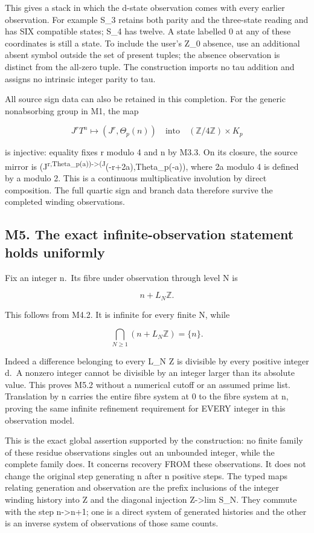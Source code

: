 This gives a stack in which the d-state observation comes with every
earlier observation. For example S\_3 retains both parity and the
three-state reading and has SIX compatible states; S\_4 has twelve. A
state labelled 0 at any of these coordinates is still a state. To
include the user's Z\_0 absence, use an additional absent symbol outside
the set of present tuples; the absence observation is distinct from the
all-zero tuple. The construction imports no tau addition and assigns no
intrinsic integer parity to tau.

All source sign data can also be retained in this completion. For the
generic nonabsorbing group in M1, the map

\[
J^rT^n\longmapsto(J^r,\Theta_p(n))
\quad\text{into}\quad (\mathbb Z/4\mathbb Z)\times K_p
\tag{M4.3}
\]

is injective: equality fixes r modulo 4 and n by M3.3. On its closure,
the source mirror is
(J\textsuperscript{r,Theta\_p(a))-\textgreater(J}(-r+2a),Theta\_p(-a)),
where 2a modulo 4 is defined by a modulo 2. This is a continuous
multiplicative involution by direct composition. The full quartic sign
and branch data therefore survive the completed winding observations.

\subsection{M5. The exact infinite-observation statement holds
uniformly}\label{m5.-the-exact-infinite-observation-statement-holds-uniformly}

Fix an integer n.~Its fibre under observation through level N is

\[
n+L_N\mathbb Z.
\tag{M5.1}
\]

This follows from M4.2. It is infinite for every finite N, while

\[
\bigcap_{N\ge1}(n+L_N\mathbb Z)=\{n\}.
\tag{M5.2}
\]

Indeed a difference belonging to every L\_N Z is divisible by every
positive integer d.~A nonzero integer cannot be divisible by an integer
larger than its absolute value. This proves M5.2 without a numerical
cutoff or an assumed prime list. Translation by n carries the entire
fibre system at 0 to the fibre system at n, proving the same infinite
refinement requirement for EVERY integer in this observation model.

This is the exact global assertion supported by the construction: no
finite family of these residue observations singles out an unbounded
integer, while the complete family does. It concerns recovery FROM these
observations. It does not change the original step generating n after n
positive steps. The typed maps relating generation and observation are
the prefix inclusions of the integer winding history into Z and the
diagonal injection Z-\textgreater lim S\_N. They commute with the step
n-\textgreater n+1; one is a direct system of generated histories and
the other is an inverse system of observations of those same counts.

